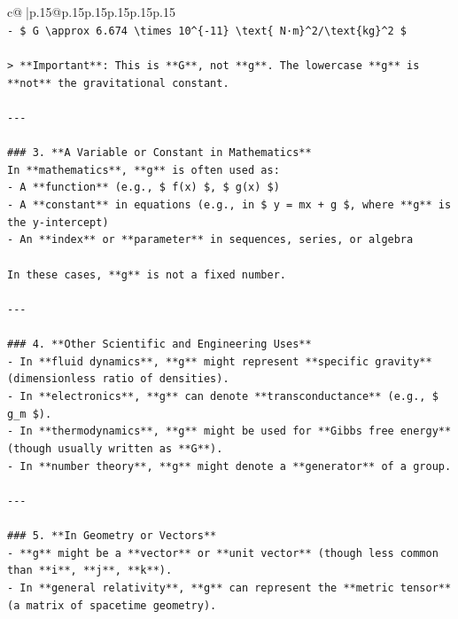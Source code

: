 \documentclass{article}
\begin{document}
{\begin{supertabular}{c@{$\;$}|p{.15\linewidth}@{}p{.15\linewidth}p{.15\linewidth}p{.15\linewidth}p{.15\linewidth}p{.15\linewidth}}
{{{\\ 
\texttt{{-} \$ G \textbackslash{}approx 6.674 \textbackslash{}times 10\^{}\{{-}11\} \textbackslash{}text\{ N·m\}\^{}2/\textbackslash{}text\{kg\}\^{}2 \$} \\
\\ 
\texttt{> **Important**: This is **G**, not **g**. The lowercase **g** is **not** the gravitational constant.} \\
\\ 
\texttt{{-}{-}{-}} \\
\\ 
\texttt{\#\#\# 3. **A Variable or Constant in Mathematics**} \\
\texttt{In **mathematics**, **g** is often used as:} \\
\texttt{{-} A **function** (e.g., \$ f(x) \$, \$ g(x) \$)} \\
\texttt{{-} A **constant** in equations (e.g., in \$ y = mx + g \$, where **g** is the y{-}intercept)} \\
\texttt{{-} An **index** or **parameter** in sequences, series, or algebra} \\
\\ 
\texttt{In these cases, **g** is not a fixed number.} \\
\\ 
\texttt{{-}{-}{-}} \\
\\ 
\texttt{\#\#\# 4. **Other Scientific and Engineering Uses**} \\
\texttt{{-} In **fluid dynamics**, **g** might represent **specific gravity** (dimensionless ratio of densities).} \\
\texttt{{-} In **electronics**, **g** can denote **transconductance** (e.g., \$ g\_m \$).} \\
\texttt{{-} In **thermodynamics**, **g** might be used for **Gibbs free energy** (though usually written as **G**).} \\
\texttt{{-} In **number theory**, **g** might denote a **generator** of a group.} \\
\\ 
\texttt{{-}{-}{-}} \\
\\ 
\texttt{\#\#\# 5. **In Geometry or Vectors**} \\
\texttt{{-} **g** might be a **vector** or **unit vector** (though less common than **i**, **j**, **k**).} \\
\texttt{{-} In **general relativity**, **g** can represent the **metric tensor** (a matrix of spacetime geometry).} \\
}}}
\end{supertabular}}
\end{document}
